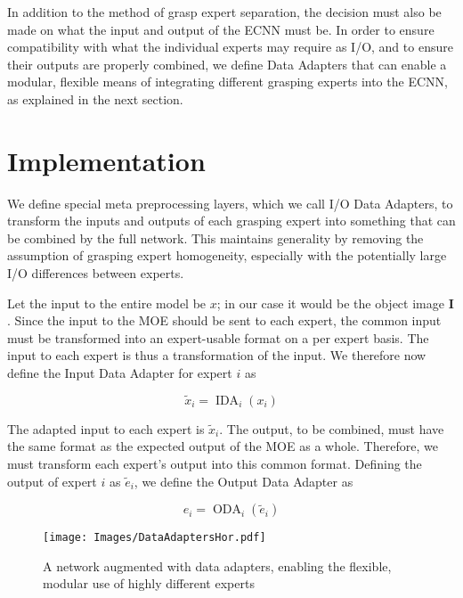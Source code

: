 \documentclass[letterpaper, 10 pt, conference]{ieeeconf}
\begin{document}
In addition to the method of grasp expert separation, the decision must also be made on what the input and output of the ECNN must be.  In order to ensure compatibility with what the individual experts may require as I/O, and to ensure their outputs are properly combined, we define Data Adapters that can enable a modular, flexible means of integrating different grasping experts into the ECNN, as explained in the next section.

\section{Implementation}
\label{sec:implementation}
We define special meta preprocessing layers, which we call I/O Data Adapters, to transform the inputs and outputs of each grasping expert into something that can be combined by the full network. This maintains generality by removing the assumption of grasping expert homogeneity, especially with the potentially large I/O differences between experts.

Let the input to the entire model be $x$; in our case it would be the object image $\mathbf{I}$.  Since the input to the MOE should be sent to each expert, the common input must be transformed into an expert-usable format on a per expert basis.  The input to each expert is thus a transformation of the input.  We therefore now define the Input Data Adapter for expert $i$ as

\begin{equation}
    \tilde{x}_i = \operatorname{IDA}_i(x_i)
\end{equation}

The adapted input to each expert is $\tilde{x}_i$.  The output, to be combined, must have the same format as the expected output of the MOE as a whole.  Therefore, we must transform each expert's output into this common format.  Defining the output of expert $i$ as $\tilde{e}_i$, we define the Output Data Adapter as

\begin{equation}
    e_i = \operatorname{ODA}_i(\tilde{e}_i)
\end{equation}

\begin{figure}
  \texttt{[image: Images/DataAdaptersHor.pdf]}
  \caption{A network augmented with data adapters, enabling the flexible, modular use of highly different experts}
  \label{fig:dataAdapters}
 \vspace{-12pt}
\end{figure}
\end{document}
